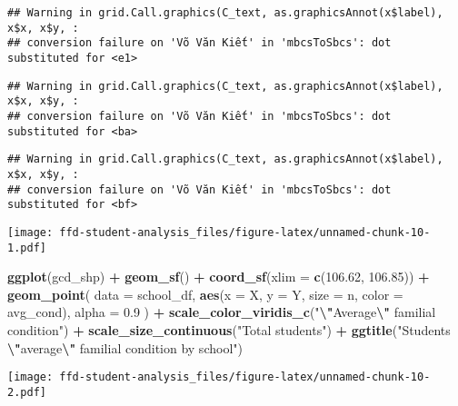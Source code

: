 \documentclass[
]{article}
\newenvironment{Shaded}{\begin{snugshade}}{\end{snugshade}}
\newcommand{\AttributeTok}[1]{\textcolor[rgb]{0.13,0.29,0.53}{#1}}
\newcommand{\FloatTok}[1]{\textcolor[rgb]{0.00,0.00,0.81}{#1}}
\newcommand{\FunctionTok}[1]{\textcolor[rgb]{0.13,0.29,0.53}{\textbf{#1}}}
\newcommand{\NormalTok}[1]{#1}
\newcommand{\SpecialCharTok}[1]{\textcolor[rgb]{0.81,0.36,0.00}{\textbf{#1}}}
\newcommand{\StringTok}[1]{\textcolor[rgb]{0.31,0.60,0.02}{#1}}
\begin{document}
\begin{verbatim}
## Warning in grid.Call.graphics(C_text, as.graphicsAnnot(x$label), x$x, x$y, :
## conversion failure on 'Võ Văn Kiết' in 'mbcsToSbcs': dot substituted for <e1>
\end{verbatim}

\begin{verbatim}
## Warning in grid.Call.graphics(C_text, as.graphicsAnnot(x$label), x$x, x$y, :
## conversion failure on 'Võ Văn Kiết' in 'mbcsToSbcs': dot substituted for <ba>
\end{verbatim}

\begin{verbatim}
## Warning in grid.Call.graphics(C_text, as.graphicsAnnot(x$label), x$x, x$y, :
## conversion failure on 'Võ Văn Kiết' in 'mbcsToSbcs': dot substituted for <bf>
\end{verbatim}

\texttt{[image: ffd-student-analysis\_files/figure-latex/unnamed-chunk-10-1.pdf]}

\begin{Shaded}
\begin{Highlighting}[]
\FunctionTok{ggplot}\NormalTok{(gcd\_shp) }\SpecialCharTok{+}
  \FunctionTok{geom\_sf}\NormalTok{() }\SpecialCharTok{+}
  \FunctionTok{coord\_sf}\NormalTok{(}\AttributeTok{xlim =} \FunctionTok{c}\NormalTok{(}\FloatTok{106.62}\NormalTok{, }\FloatTok{106.85}\NormalTok{)) }\SpecialCharTok{+}
  \FunctionTok{geom\_point}\NormalTok{(}
    \AttributeTok{data =}\NormalTok{ school\_df,}
    \FunctionTok{aes}\NormalTok{(}\AttributeTok{x =}\NormalTok{ X, }\AttributeTok{y =}\NormalTok{ Y, }\AttributeTok{size =}\NormalTok{ n, }\AttributeTok{color =}\NormalTok{ avg\_cond),}
    \AttributeTok{alpha =} \FloatTok{0.9}
\NormalTok{  ) }\SpecialCharTok{+}
  \FunctionTok{scale\_color\_viridis\_c}\NormalTok{(}\StringTok{"}\SpecialCharTok{\textbackslash{}"}\StringTok{Average}\SpecialCharTok{\textbackslash{}"}\StringTok{ familial condition"}\NormalTok{) }\SpecialCharTok{+}
  \FunctionTok{scale\_size\_continuous}\NormalTok{(}\StringTok{"Total students"}\NormalTok{) }\SpecialCharTok{+}
  \FunctionTok{ggtitle}\NormalTok{(}\StringTok{"Student\textquotesingle{}s }\SpecialCharTok{\textbackslash{}"}\StringTok{average}\SpecialCharTok{\textbackslash{}"}\StringTok{ familial condition by school"}\NormalTok{)}
\end{Highlighting}
\end{Shaded}

\texttt{[image: ffd-student-analysis\_files/figure-latex/unnamed-chunk-10-2.pdf]}
\end{document}
